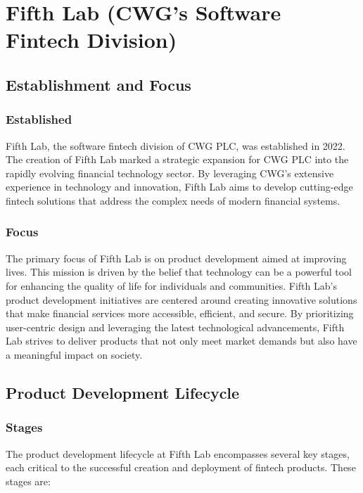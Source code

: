 \documentclass[a4paper,12pt]{report}
\begin{document}
	\newpage
	
	\section{Fifth Lab (CWG’s Software Fintech Division)}
	
	\subsection{Establishment and Focus}
	
	\subsubsection{Established}
	Fifth Lab, the software fintech division of CWG PLC, was established in 2022. The creation of Fifth Lab marked a strategic expansion for CWG PLC into the rapidly evolving financial technology sector. By leveraging CWG’s extensive experience in technology and innovation, Fifth Lab aims to develop cutting-edge fintech solutions that address the complex needs of modern financial systems.
	
	\subsubsection{Focus}
	The primary focus of Fifth Lab is on product development aimed at improving lives. This mission is driven by the belief that technology can be a powerful tool for enhancing the quality of life for individuals and communities. Fifth Lab’s product development initiatives are centered around creating innovative solutions that make financial services more accessible, efficient, and secure. By prioritizing user-centric design and leveraging the latest technological advancements, Fifth Lab strives to deliver products that not only meet market demands but also have a meaningful impact on society.
	
	\newpage
	
	\subsection{Product Development Lifecycle}
	
	\subsubsection{Stages}
	The product development lifecycle at Fifth Lab encompasses several key stages, each critical to the successful creation and deployment of fintech products. These stages are:
	
\end{document}
